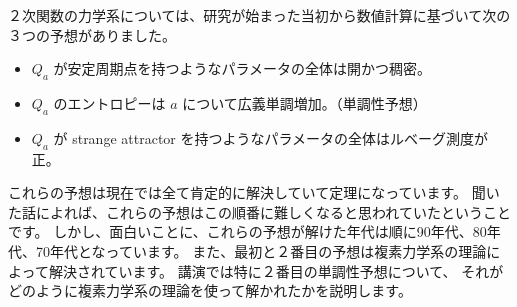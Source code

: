 \documentclass[uplatex,dvipdfmx]{jlreq}
\begin{document}
２次関数の力学系については、研究が始まった当初から数値計算に基づいて次の３つの予想がありました。
\begin{itemize}
  \item $Q_a$ が安定周期点を持つようなパラメータの全体は開かつ稠密。
  \item $Q_a$ のエントロピーは $a$ について広義単調増加。（単調性予想）
  \item $Q_a$ が strange attractor を持つようなパラメータの全体はルベーグ測度が正。
\end{itemize}
これらの予想は現在では全て肯定的に解決していて定理になっています。
聞いた話によれば、これらの予想はこの順番に難しくなると思われていたということです。
しかし、面白いことに、これらの予想が解けた年代は順に90年代、80年代、70年代となっています。
また、最初と２番目の予想は複素力学系の理論によって解決されています。
講演では特に２番目の単調性予想について、
それがどのように複素力学系の理論を使って解かれたかを説明します。
\end{document}

